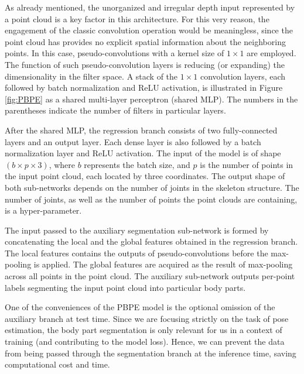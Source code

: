 \noindent
As already mentioned, the unorganized and irregular depth input represented by a point cloud is a key factor in this architecture. For this very reason, the engagement of the classic convolution operation would be meaningless, since the point cloud has provides no explicit spatial information about the neighboring points. In this case, pseudo-convolutions with a kernel size of $1\times1$ are employed. The function of such pseudo-convolution layers is reducing (or expanding) the dimensionality in the filter space. A stack of the $1 \times 1$ convolution layers, each followed by batch normalization and ReLU activation, is illustrated in Figure \ref{fig:PBPE} as a shared multi-layer perceptron (shared MLP). The numbers in the parentheses indicate the number of filters in particular layers.\par
\vspace{5mm}
\noindent After the shared MLP, the regression branch consists of two fully-connected layers and an output layer. Each dense layer is also followed by a batch normalization layer and ReLU activation. The input of the model is of shape $(b \times p \times 3)$, where $b$ represents the batch size, and $p$ is the number of points in the input point cloud, each located by three coordinates. The output shape of both sub-networks depends on the number of joints in the skeleton structure. The number of joints, as well as the number of points the point clouds are containing, is a hyper-parameter.\par
\vspace{5mm}
\noindent The input passed to the auxiliary segmentation sub-network is formed by concatenating the local and the global features obtained in the regression branch. The local features contains the outputs of pseudo-convolutions before the max-pooling is applied. The global features are acquired as the result of max-pooling across all points in the point cloud. The auxiliary sub-network outputs per-point labels segmenting the input point cloud into particular body parts.\par
\vspace{5mm}
\noindent One of the conveniences of the PBPE model is the optional omission of the auxiliary branch at test time. Since we are focusing strictly on the task of pose estimation, the body part segmentation is only relevant for us in a context of training (and contributing to the model loss). Hence, we can prevent the data from being passed through the segmentation branch at the inference time, saving computational cost and time.


